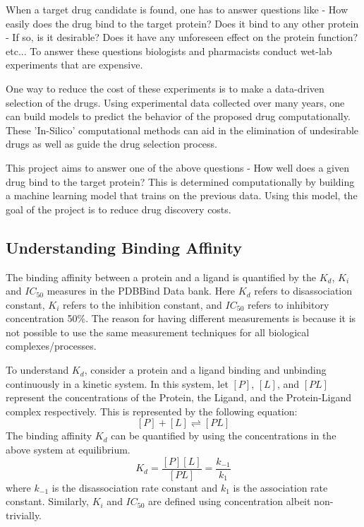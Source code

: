 \documentclass[11pt]{article}
\begin{document}
When a target drug candidate is found,  one has to answer questions like - How easily does the drug bind to the target protein? Does it bind to any other protein - If so, is it desirable? Does it have any unforeseen effect on the protein function? etc...  To answer these questions biologists and pharmacists conduct wet-lab experiments that are expensive.

One way to reduce the cost of these experiments is to make a data-driven selection of the drugs.  Using experimental data collected over many years, one can build models to predict the behavior of the proposed drug computationally.  These 'In-Silico' computational methods can aid in the elimination of undesirable drugs as well as guide the drug selection process.

This project aims to answer one of the above questions - How well does a given drug bind to the target protein? This is determined computationally by building a machine learning model that trains on the previous data.  Using this model,  the goal of the project is to reduce drug discovery costs. 

\subsection{Understanding Binding Affinity}
The binding affinity between a protein and a ligand is quantified by the $K_d$, $K_i$ and $IC_{50}$ measures in the PDBBind Data bank.
Here $K_d$ refers to disassociation constant, $K_i$ refers to the inhibition constant, and $IC_{50}$ refers to 
inhibitory concentration 50\%.
The reason for having different measurements is because it is not possible to use the same measurement techniques
for all biological complexes/processes.

To understand $K_d$, consider a protein and a ligand binding and unbinding continuously in a kinetic system.
In this system, let $[P]$, $[L]$, and $[PL]$ represent the concentrations of the Protein, the Ligand, and the Protein-Ligand complex respectively.
This is represented by the following equation:
$$[P] + [L] \rightleftharpoons [PL]$$
The binding affinity $K_d$ can be quantified by using the concentrations in the above system at equilibrium.
$$K_d = \frac{[P][L]}{[PL]} = \frac{k_{-1}}{k_1}$$
where $k_{-1}$ is the disassociation rate constant and $k_1$ is the association rate constant.
Similarly, $K_i$ and $IC_{50}$ are defined using concentration albeit non-trivially. 
\cite{binding_affinity_description}
\end{document}
